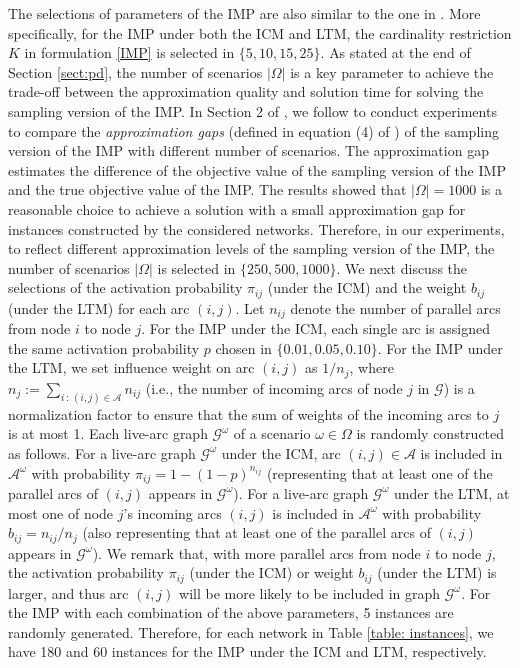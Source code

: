 \documentclass[a4paper,10pt]{article}
\newcommand{\G}{\mathcal{G}}
\newcommand{\A}{\mathcal{A}}
\theoremstyle{plain}
\newcommand{\revv}[1]{{#1}}
\begin{document}
{	The selections of parameters of the IMP are also similar to the one in \cite{Guney2020,Wu2017}.
	More specifically, for the IMP under both the ICM and LTM, the cardinality restriction $K$ in formulation \eqref{IMP} is selected in $\{5,10,15,25\}$.
	\revv{As stated at the end of Section \ref{sect:pd}, the number of scenarios $|\Omega|$ is a key parameter to achieve the trade-off between the approximation quality and solution time for solving the sampling version of the IMP.
		In Section 2 of \cite{Chen2022}, we follow \cite{Kahr2020} to conduct experiments to compare the  \emph{approximation gaps} (defined in equation (4) of \cite{Kahr2020}) of the sampling version of the IMP with different number of scenarios.
		The approximation gap estimates the difference of the objective value of the sampling version of the IMP and the true objective value of the IMP.
		The results showed  that $|\Omega|=1000$ is a reasonable choice to achieve a solution with a small approximation gap for instances constructed by the considered networks.
		Therefore, in our experiments,  to reflect different approximation levels of the sampling version
		of the IMP, the number of scenarios $|\Omega|$ is selected in $\{250,500,1000\}$.}
	We next discuss the selections of the activation probability $\pi_{ij}$ (under the ICM) and the weight $b_{ij}$ (under the LTM) for each arc $(i,j)$.
	Let $n_{ij}$ denote the number of parallel arcs from node $i$ to node $j$.
	For the IMP under the ICM, each single arc is assigned the same activation probability $p$ chosen in $\{0.01,0.05,0.10\}$.
	\revv{For the IMP under the LTM,
		we set influence weight on arc $(i,j)$ as $1/n_j$, where $n_j:=\sum_{i\,:\,(i,j)\in\A}n_{ij}$ (\revv{i.e.}, the number of incoming arcs of node $j$ in $\G$) is a normalization factor to ensure that the sum of weights of the incoming arcs to $j$ is \revv{at most} 1.}
	\revv{Each live-arc graph $\mathcal{G}^\omega$ of a scenario $\omega\in \Omega$ is randomly constructed as follows.
		For a live-arc graph $\mathcal{G}^{\omega}$ under the ICM, arc $(i,j)\in \mathcal{A}$ is included in $\mathcal{A}^\omega$ with probability $\pi_{ij}=1-(1-p)^{n_{ij}}$ (representing that at least one of the parallel arcs of $(i,j)$
		appears in $\mathcal{G}^{\omega}$).
		For a live-arc graph $\mathcal{G}^{\omega}$ under the LTM, at most one of node $j$'s incoming arcs $(i,j)$ is included in $\mathcal{A}^\omega$ with probability $b_{ij}=n_{ij}/n_j$ (also representing that at least one of the parallel arcs of $(i,j)$
		appears in $\mathcal{G}^{\omega}$).
		We remark that, with more parallel arcs from node $i$ to node $j$, the activation probability $\pi_{ij}$ (under the ICM) or weight $b_{ij}$ (under the LTM) is larger, and thus arc $(i,j)$ will be more likely to be included in graph $\mathcal{G}^\omega$.}
	For the IMP with each combination of the above parameters, 5 instances are randomly generated.
	Therefore, for each \revv{network} in Table \ref{table: instances}, we have 180 and 60 instances for the IMP under the ICM and LTM, respectively.
	
}
\end{document}
